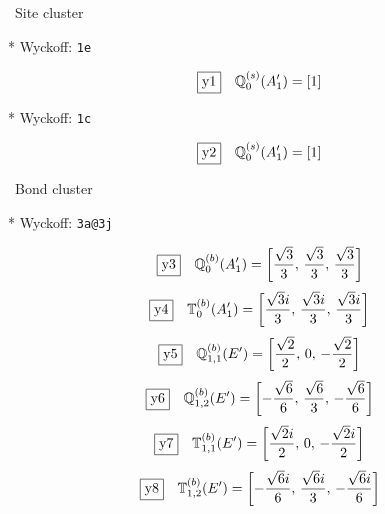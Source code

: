 \documentclass[fleqn,10pt,landscape]{jsarticle}
\begin{document}
\noindent\textbullet\, Site cluster

\vspace{5mm}

\noindent ** Wyckoff: \texttt{1e}

\begin{dmath*}
\fbox{y1}\quad \mathbb{Q}_{0}^{(s)}(A_{1}^{\prime})=\left[ 1 \right]
\end{dmath*}
\vspace{5mm}

\noindent ** Wyckoff: \texttt{1c}

\begin{dmath*}
\fbox{y2}\quad \mathbb{Q}_{0}^{(s)}(A_{1}^{\prime})=\left[ 1 \right]
\end{dmath*}
\vspace{5mm}

\noindent\textbullet\, Bond cluster

\vspace{5mm}

\noindent ** Wyckoff: \texttt{3a@3j}

\begin{dmath*}
\fbox{y3}\quad \mathbb{Q}_{0}^{(b)}(A_{1}^{\prime})=\left[ \frac{\sqrt{3}}{3},\, \frac{\sqrt{3}}{3},\, \frac{\sqrt{3}}{3} \right]
\end{dmath*}
\begin{dmath*}
\fbox{y4}\quad \mathbb{T}_{0}^{(b)}(A_{1}^{\prime})=\left[ \frac{\sqrt{3} i}{3},\, \frac{\sqrt{3} i}{3},\, \frac{\sqrt{3} i}{3} \right]
\end{dmath*}
\begin{dmath*}
\fbox{y5}\quad \mathbb{Q}_{1,1}^{(b)}(E^{\prime})=\left[ \frac{\sqrt{2}}{2},\, 0,\, - \frac{\sqrt{2}}{2} \right]
\end{dmath*}
\begin{dmath*}
\fbox{y6}\quad \mathbb{Q}_{1,2}^{(b)}(E^{\prime})=\left[ - \frac{\sqrt{6}}{6},\, \frac{\sqrt{6}}{3},\, - \frac{\sqrt{6}}{6} \right]
\end{dmath*}
\begin{dmath*}
\fbox{y7}\quad \mathbb{T}_{1,1}^{(b)}(E^{\prime})=\left[ \frac{\sqrt{2} i}{2},\, 0,\, - \frac{\sqrt{2} i}{2} \right]
\end{dmath*}
\begin{dmath*}
\fbox{y8}\quad \mathbb{T}_{1,2}^{(b)}(E^{\prime})=\left[ - \frac{\sqrt{6} i}{6},\, \frac{\sqrt{6} i}{3},\, - \frac{\sqrt{6} i}{6} \right]
\end{dmath*}
\vspace{5mm}
\end{document}

